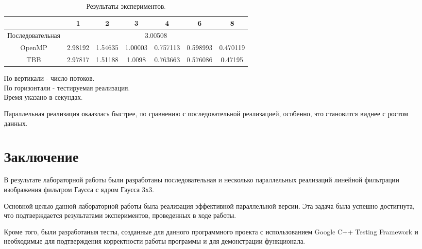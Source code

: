 \documentclass{report}
\begin{document}
 \begin{table}[htbp]
        \centering
        \begin{tabular}{|c|c|c|c|c|c|c|}
            \hline
                             & 1       & 2       & 3       & 4        & 6        & 8        \\ \hline
            Последовательная & \multicolumn{6}{c|}{3.00508}                                 \\ \hline
            OpenMP           & 2.98192 & 1.54635 & 1.00003 & 0.757113 & 0.598993 & 0.470119 \\ \hline
            TBB              & 2.97817 & 1.51188 & 1.0098  & 0.763663 & 0.576086 & 0.47195  \\ \hline
        \end{tabular}
        \caption{Результаты экспериментов.}
        \label{tab:results}
        По вертикали - число потоков. \\
        По горизонтали - тестируемая реализация. \\
        Время указано в секундах.
    \end{table}

\par Параллельная реализация окаазлась быстрее, по сравнению с последовательной реализацией, особенно, это становится виднее с ростом данных. 
\newpage

\section*{Заключение}
В результате лабораторной работы были разработаны последовательная и несколько параллельных реализаций линейной фильтрации изображения фильтром Гаусса с ядром Гаусса 3х3.
\par Основной целью данной лабораторной работы была реализация эффективной параллельной версии. Эта задача была успешно достигнута, что подтверждается результатами экспериментов, проведенных в ходе работы.
\par Кроме того, были разработаныя тесты, созданные для данного программного проекта с использованием Google C++ Testing Framework и необходимые для подтверждения корректности работы программы и для демонстрации функционала.
\newpage

\end{document}
